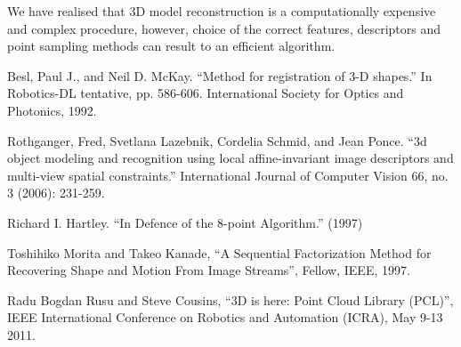 \documentclass[11pt,twocolumn]{article}
\begin{document}
We have realised that 3D model reconstruction is a computationally expensive and complex procedure, however, choice of the correct features, descriptors and point sampling methods can result to an efficient algorithm. 
\label{conclusion}


\begin{thebibliography}{9}

Besl, Paul J., and Neil D. McKay. ``Method for registration of 3-D shapes.'' In Robotics-DL tentative, pp. 586-606. International Society for Optics and Photonics, 1992.

Rothganger, Fred, Svetlana Lazebnik, Cordelia Schmid, and Jean Ponce. ``3d object modeling and recognition using local affine-invariant image descriptors and multi-view spatial constraints.'' International Journal of Computer Vision 66, no. 3 (2006): 231-259.

Richard I. Hartley. ``In Defence of the 8-point Algorithm.'' (1997)

Toshihiko Morita and Takeo Kanade, ``A Sequential Factorization Method for Recovering Shape and Motion From Image Streams'', Fellow, IEEE, 1997.

Radu Bogdan Rusu and Steve Cousins, ``3D is here: Point Cloud Library (PCL)'', IEEE International Conference on Robotics and Automation (ICRA), May 9-13 2011.





\end{thebibliography}
\end{document}
